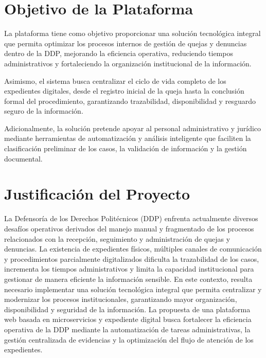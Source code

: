 \section{Objetivo de la Plataforma}

La plataforma tiene como objetivo proporcionar una solución tecnológica integral que permita optimizar los procesos internos de gestión de quejas y denuncias dentro de la DDP, mejorando la eficiencia operativa, reduciendo tiempos administrativos y fortaleciendo la organización institucional de la información.

Asimismo, el sistema busca centralizar el ciclo de vida completo de los expedientes digitales, desde el registro inicial de la queja hasta la conclusión formal del procedimiento, garantizando trazabilidad, disponibilidad y resguardo seguro de la información.

Adicionalmente, la solución pretende apoyar al personal administrativo y jurídico mediante herramientas de automatización y análisis inteligente que faciliten la clasificación preliminar de los casos, la validación de información y la gestión documental.


\section{Justificación del Proyecto}

La Defensoría de los Derechos Politécnicos (DDP) enfrenta actualmente diversos desafíos operativos derivados del manejo manual y fragmentado de los procesos relacionados con la recepción, seguimiento y administración de quejas y denuncias. La existencia de expedientes físicos, múltiples canales de comunicación y procedimientos parcialmente digitalizados dificulta la trazabilidad de los casos, incrementa los tiempos administrativos y limita la capacidad institucional para gestionar de manera eficiente la información sensible. En este contexto, resulta necesario implementar una solución tecnológica integral que permita centralizar y modernizar los procesos institucionales, garantizando mayor organización, disponibilidad y seguridad de la información. La propuesta de una plataforma web basada en microservicios y expediente digital busca fortalecer la eficiencia operativa de la DDP mediante la automatización de tareas administrativas, la gestión centralizada de evidencias y la optimización del flujo de atención de los expedientes.

